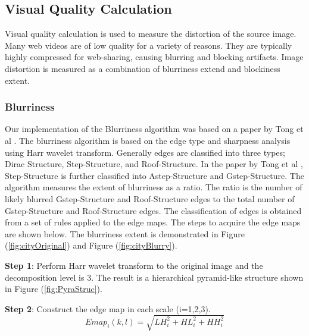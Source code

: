 \subsection{Visual Quality Calculation} \label{sec:BlurBlockSec}

Visual quality calculation is used to measure the distortion of the source image.  
Many web videos are of low quality for a variety of reasons.  
They are typically highly compressed for web-sharing, causing blurring and blocking artifacts.  
Image distortion is measured as a combination of blurriness extend and blockiness extent.

\subsubsection{Blurriness}

Our implementation of the Blurriness algorithm was based on a paper by Tong et al \cite{Tong}.  
The blurriness algorithm is based on the edge type and sharpness analysis using Harr wavelet transform.  
Generally edges are classified into three types; Dirac Structure, Step-Structure, and Roof-Structure.  
In the paper by Tong et al \cite{Tong}, Step-Structure is further classified into Astep-Structure and Gstep-Structure.   
The algorithm measures the extent of blurriness as a ratio.  The ratio is the number of likely blurred 
Gstep-Structure and Roof-Structure edges to the total number of Gstep-Structure and Roof-Structure edges.  
The classification of edges is obtained from a set of rules applied to the edge maps.  
The steps to acquire the edge maps are shown below.  
The blurriness extent is demonstrated in Figure (\ref{fig:cityOriginal}) and Figure (\ref{fig:cityBlurry}).

\vspace{5 mm}

\noindent\textbf{Step 1}: Perform Harr wavelet transform to the original image and the decomposition level is 3.  
The result is a hierarchical pyramid-like structure shown in Figure (\ref{fig:PyraStruc}).

\vspace{5 mm}

\noindent\textbf{Step 2}: Construct the edge map in each scale (i=1,2,3).
\begin{equation}
Emap_{i}(k,l)=\sqrt{LH_{i}^{2}+HL_{i}^{2}+HH_{i}^{2}}  
\end{equation}

\vspace{5 mm}

